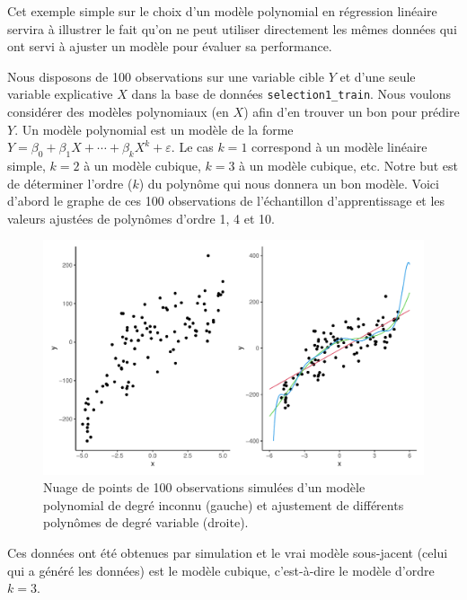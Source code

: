 \documentclass[
  11pt,
  letterpaper,
]{scrbook}
\theoremstyle{definition}
\theoremstyle{remark}
\begin{document}
Cet exemple simple sur le choix d'un modèle polynomial en régression
linéaire servira à illustrer le fait qu'on ne peut utiliser directement
les mêmes données qui ont servi à ajuster un modèle pour évaluer sa
performance.

Nous disposons de 100 observations sur une variable cible \(Y\) et d'une
seule variable explicative \(X\) dans la base de données
\texttt{selection1\_train}. Nous voulons considérer des modèles
polynomiaux (en \(X\)) afin d'en trouver un bon pour prédire \(Y\). Un
modèle polynomial est un modèle de la forme
\(Y=\beta_0 + \beta_1X+\cdots+\beta_kX^k+\varepsilon\). Le cas \(k=1\)
correspond à un modèle linéaire simple, \(k=2\) à un modèle cubique,
\(k=3\) à un modèle cubique, etc. Notre but est de déterminer l'ordre
(\(k\)) du polynôme qui nous donnera un bon modèle. Voici d'abord le
graphe de ces 100 observations de l'échantillon d'apprentissage et les
valeurs ajustées de polynômes d'ordre 1, 4 et 10.

\begin{figure}[ht!]

{\centering \includegraphics[width=1\textwidth,height=\textheight]{selectionmodeles_files/figure-pdf/fig-donneestest-1.pdf}

}

\caption{\label{fig-donneestest}Nuage de points de 100 observations
simulées d'un modèle polynomial de degré inconnu (gauche) et ajustement
de différents polynômes de degré variable (droite).}

\end{figure}

Ces données ont été obtenues par simulation et le vrai modèle
sous-jacent (celui qui a généré les données) est le modèle cubique,
c'est-à-dire le modèle d'ordre \(k=3\).
\end{document}
